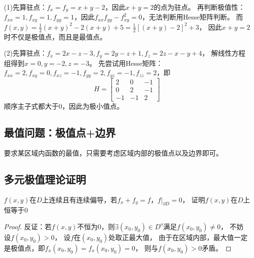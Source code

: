\begin{solution}
  (1)先算驻点：$f_x = f_y = x+y-2$，因此$x + y = 2$的点为驻点。
  再判断极值性：$f_{xx} = 1, f_{xy} = 1, f_{yy} = 1$，因此$f_{xx}f_{yy} - f_{xy}^2 = 0$，无法判断用Hesse矩阵判断。
  而$f(x,y) = \frac{1}{2}(x+y)^2 - 2(x+y) + 5 = \frac{1}{2} \left[ (x+y) - 2 \right]^2 + 3$，
  因此$x+y = 2$时不仅是极值点，而且是最值点。

  (2)先算驻点：$f_x = 2x - z - 3, f_y = 2y - z + 1, f_z = 2z - x - y + 4$，
  解线性方程组得到$x = 0, y = -2, z = -3$。
  先尝试用Hesse矩阵：$f_{xx} = 2, f_{xy} = 0, f_{xz} = -1, f_{yy} = 2, f_{yz} = -1, f_{zz} = 2$，即
  \begin{equation*}
    H = \left[
      \begin{array}{ccc}
        2&0&-1\\
        0&2&-1\\
        -1&-1&2
      \end{array}
    \right]
  \end{equation*}
  顺序主子式都大于$0$，因此为极小值点。
\end{solution}

\subsection{最值问题：极值点+边界}

要求某区域内函数的最值，只需要考虑区域内部的极值点以及边界即可。










\subsection{多元极值理论证明}

\begin{exercise}
  $f(x,y)$在$D$上连续且有连续偏导，若$f_x + f_y = f$，$f \bigg|_{\partial D} = 0$，
  证明$f(x,y)$在$D$上恒等于$0$
\end{exercise}

\begin{proof}
  反证：若$f(x,y)$不恒为$0$，则$\exists(x_0,y_0) \in D^o$满足$f(x_0,y_0) \neq 0$，
  不妨设$f(x_0,y_0) > 0$，
  设$f$在$(x_0,y_0)$处取正最大值，
  由于在区域内部，最大值一定是极值点，即$f_x(x_0,y_0) = f_x(x_0,y_0) = 0$，
  则与$f(x_0,y_0) > 0$矛盾。
\end{proof}

~

